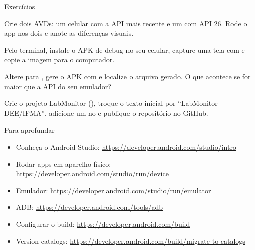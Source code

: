 \documentclass[aspectratio=169,10pt]{beamer}
\begin{document}
\begin{frame}{Exercícios}
  \begin{exercicio}
    Crie dois AVDs: um celular com a API mais recente e um com API 26. Rode o app nos dois e anote as diferenças visuais.
  \end{exercicio}
  \begin{exercicio}
    Pelo terminal, instale o APK de debug no seu celular, capture uma tela com  e copie a imagem para o computador.
  \end{exercicio}
  \begin{exercicio}
    Altere  para , gere o APK com  e localize o arquivo gerado. O que acontece se  for maior que a API do seu emulador?
  \end{exercicio}
  \begin{projeto}
    Crie o projeto LabMonitor (), troque o texto inicial por ``LabMonitor --- DEE/IFMA'', adicione um  no  e publique o repositório no GitHub.
  \end{projeto}
\end{frame}

\begin{frame}{Para aprofundar}
  \small
  \begin{itemize}
    \item Conheça o Android Studio: \url{https://developer.android.com/studio/intro}
    \item Rodar apps em aparelho físico: \url{https://developer.android.com/studio/run/device}
    \item Emulador: \url{https://developer.android.com/studio/run/emulator}
    \item ADB: \url{https://developer.android.com/tools/adb}
    \item Configurar o build: \url{https://developer.android.com/build}
    \item Version catalogs: \url{https://developer.android.com/build/migrate-to-catalogs}
  \end{itemize}
\end{frame}

\end{document}
